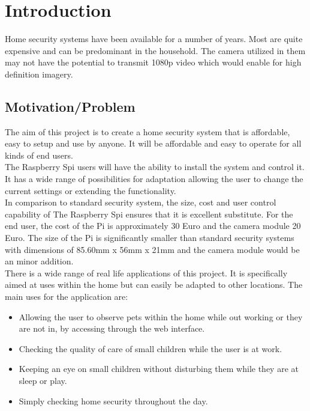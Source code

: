 \documentclass[12pt]{report}
\begin{document}
\tableofcontents
\chapter{Introduction}
\label{ch:intro} 

Home security systems have been available for a number of years. Most are quite expensive and can be predominant in the household. The camera utilized in them may not have the potential to transmit 1080p video which would enable for high definition imagery. 

\section{Motivation/Problem}
\label{sec:motprob}
The aim of this project is to create a home security system that is affordable, easy to setup and use by anyone. It will be affordable and easy to operate for all kinds of end users.\\

The Raspberry Spi  users will have the ability to install the system and control it.  It has a wide range of possibilities for adaptation allowing the user to change the current settings or extending the functionality.\\

In comparison to standard security system, the size, cost and user control capability of The Raspberry Spi ensures that it is excellent substitute. For the end user, the cost of the Pi is approximately 30 Euro and the camera module 20 Euro. The size of the Pi is significantly smaller than standard security systems with dimensions of 85.60mm x 56mm x 21mm and the camera module would be an minor addition.\\

There is a wide range of real life applications of this project. It is specifically aimed at uses within the home but can easily be adapted to other locations. The main uses for the application are: \\

\begin{itemize}

   \item Allowing the user to observe pets within the home while out working or they are not in, by accessing through the web interface.\\  
  
  \item Checking the quality of care of small children while the user is at work.\\
  
  \item Keeping an eye on small children without disturbing them while they are at sleep or play.\\ 
  
  \item Simply checking home security throughout the day.\\  
  
\end{itemize}
\end{document}
